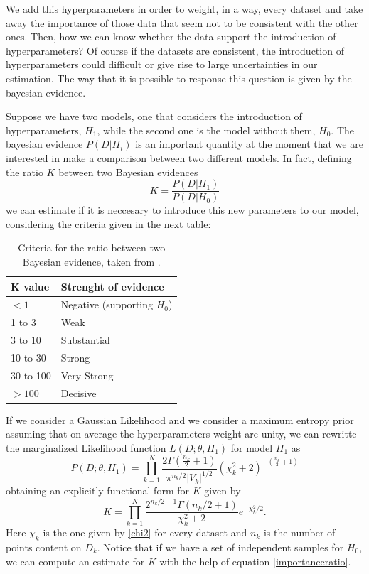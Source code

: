 \documentclass[onecolumn,           %
               showpacs,            %
               preprintnumbers,     %
               aps,                 %
               prl,          	    %
               letterpaper,             %
               superscriptaddress,      %
               nofootinbib,         %
               tightenlines,        %
               floats,floatfix      %
               ,usenatbib,
               ]{revtex4-1}
\begin{document}
We add this hyperparameters in order to weight, in a way, every dataset and take away the importance of those data that seem not to be consistent with the other ones. Then, how we can know whether the data support the introduction of hyperparameters? Of course if the datasets are consistent, the introduction of hyperparameters could difficult or give rise to large uncertainties in our estimation. The way that it is possible to response this question is given by the bayesian evidence.

Suppose we have two models, one that considers the introduction of hyperparameters, $H_1$, while the second one is the model without them, $H_0$. The bayesian evidence $P(D|H_i)$ is an important quantity at the moment that we are interested in make a comparison between two different models. In fact, defining the ratio $K$ between two Bayesian evidences
\begin{equation}
K=\frac{P(D|H_1)}{P(D|H_0)}
\end{equation}
we can estimate if it is neccesary to introduce this new parameters to our model, considering the criteria given in the next table:
\begin{table}[h!]
\centering
\begin{tabular}{||l|l||} 
 \hline
 \textbf{K value} & \textbf{Strenght of evidence} \\ [0.5ex] 
 \hline\hline
 $<1$  & Negative (supporting $H_0$)   \\ 
 \hline
 1 to 3 & Weak \\
 \hline 
3 to 10 & Substantial\\
\hline
10 to 30 & Strong\\
\hline
30 to 100 & Very Strong \\
\hline
$>100$ & Decisive\\ [1ex] 
 \hline
\end{tabular}\label{evidence}
\caption{Criteria for the ratio between two Bayesian evidence, taken from \cite{hiperp2}.}
\end{table}

If we consider a Gaussian Likelihood and we consider a maximum entropy prior assuming that on average the hyperparameters weight are unity, we can rewritte the marginalized Likelihood function $L(D;\theta,H_1)$ for model $H_1$ as
\begin{equation}
P(D;\theta,H_1)=\prod_{k=1}^N\frac{2\Gamma(\frac{n_k}{2}+1)}{\pi^{n_k/2}|V_k|^{1/2}}(\chi_k^2+2)^{-\left(\frac{n_k}{2}+1\right)}
\end{equation}
obtaining an explicitly functional form for $K$ given by
\begin{equation}
K=\prod_{k=1}^N\frac{2^{n_k/2+1}\Gamma(n_k/2+1)}{\chi^2_k+2}e^{-\chi_k^2/2}.
\end{equation}
Here $\chi_k$ is the one given by \ref{chi2} for every dataset and $n_k$ is the number of points content on $D_k$. Notice that if we have a set of independent samples for $H_0$, we can compute an estimate for $K$ with the help of equation \eqref{importanceratio}. 
\end{document}
